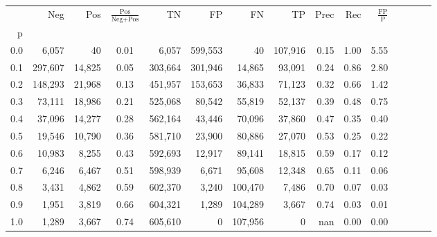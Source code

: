 \begin{tabular}{rrrcrrrrrrrrrrr}
\toprule
{} &      Neg &     Pos & $\frac{\text{Pos}}{\text{Neg}+\text{Pos}}$ &       TN &       FP &       FN &       TP &  Prec &   Rec & $\frac{\text{FP}}{\text{P}}$ \\
p   &          &         &                                            &          &          &          &          &       &       &                              \\
\midrule
0.0 &    6,057 &      40 &                                       0.01 &    6,057 &  599,553 &       40 &  107,916 &  0.15 &  1.00 &                         5.55 \\
0.1 &  297,607 &  14,825 &                                       0.05 &  303,664 &  301,946 &   14,865 &   93,091 &  0.24 &  0.86 &                         2.80 \\
0.2 &  148,293 &  21,968 &                                       0.13 &  451,957 &  153,653 &   36,833 &   71,123 &  0.32 &  0.66 &                         1.42 \\
0.3 &   73,111 &  18,986 &                                       0.21 &  525,068 &   80,542 &   55,819 &   52,137 &  0.39 &  0.48 &                         0.75 \\
0.4 &   37,096 &  14,277 &                                       0.28 &  562,164 &   43,446 &   70,096 &   37,860 &  0.47 &  0.35 &                         0.40 \\
0.5 &   19,546 &  10,790 &                                       0.36 &  581,710 &   23,900 &   80,886 &   27,070 &  0.53 &  0.25 &                         0.22 \\
0.6 &   10,983 &   8,255 &                                       0.43 &  592,693 &   12,917 &   89,141 &   18,815 &  0.59 &  0.17 &                         0.12 \\
0.7 &    6,246 &   6,467 &                                       0.51 &  598,939 &    6,671 &   95,608 &   12,348 &  0.65 &  0.11 &                         0.06 \\
0.8 &    3,431 &   4,862 &                                       0.59 &  602,370 &    3,240 &  100,470 &    7,486 &  0.70 &  0.07 &                         0.03 \\
0.9 &    1,951 &   3,819 &                                       0.66 &  604,321 &    1,289 &  104,289 &    3,667 &  0.74 &  0.03 &                         0.01 \\
1.0 &    1,289 &   3,667 &                                       0.74 &  605,610 &        0 &  107,956 &        0 &   nan &  0.00 &                         0.00 \\
\bottomrule
\end{tabular}
